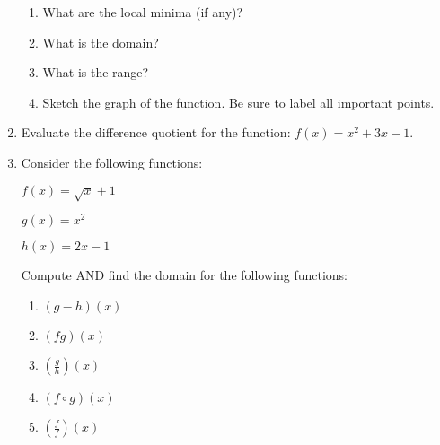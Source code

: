 \documentclass[letterpaper,12pt,fleqn]{article}
\begin{document}
\begin{enumerate}
\begin{enumerate}
  \item What are the local minima (if any)?

  \item What is the domain?

  \item What is the range?

  \item Sketch the graph of the function. Be sure to label all important
    points.
  \end{enumerate}

\item Evaluate the difference quotient for the function: $f(x)=x^2+3x-1$.
  
\item Consider the following functions:

  $f(x)=\sqrt{x}+1$

  $g(x)=x^2$

  $h(x)=2x-1$

  Compute AND find the domain for the following functions:

  \begin{enumerate}
  \item $(g-h)(x)$

  \item $(fg)(x)$

  \item $\left(\frac{g}{h}\right)(x)$

  \item $(f\circ g)(x)$

  \item $\left(\frac{f}{f}\right)(x)$
  \end{enumerate}
\end{enumerate}
\end{document}
